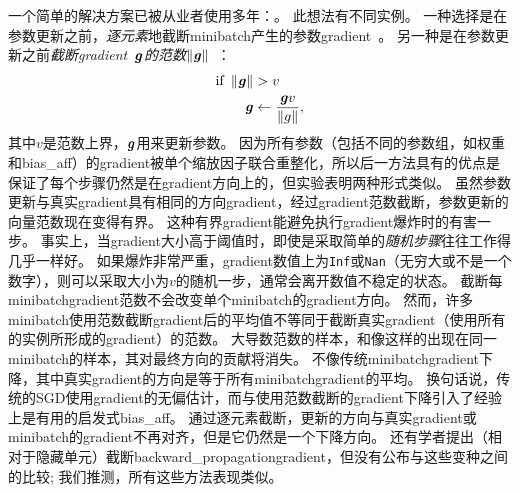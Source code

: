 一个简单的解决方案已被从业者使用多年：。
此想法有不同实例\citep{Mikolov-thesis-2012,Pascanu+al-ICML2013-small}。
一种选择是在参数更新之前，\emph{逐元素}地截断\gls{minibatch}产生的参数\gls{gradient}~\citep{Mikolov-thesis-2012}。
另一种是在参数更新之前\emph{截断\gls{gradient}~$\boldsymbol{\mathit{g}}$的范数$\left\lVert \boldsymbol{\mathit{g}} \right\rVert$}~\citep{Pascanu+al-ICML2013-small}：
\begin{align}
 \text{if}~ \left\lVert\boldsymbol{\mathit{g}}\right\rVert &> v \\
 \boldsymbol{\mathit{g}} &\gets \frac{\boldsymbol{\mathit{g}} v}{\left\lVert g\right\rVert},
\end{align}
其中$v$是范数上界，$\boldsymbol{\mathit{g}}$用来更新参数。
因为所有参数（包括不同的参数组，如权重和\gls{bias_aff}）的\gls{gradient}被单个缩放因子联合重整化，所以后一方法具有的优点是保证了每个步骤仍然是在\gls{gradient}方向上的，但实验表明两种形式类似。
虽然参数更新与真实\gls{gradient}具有相同的方向\gls{gradient}，经过\gls{gradient}范数截断，参数更新的向量范数现在变得有界。
这种有界\gls{gradient}能避免执行\gls{gradient}爆炸时的有害一步。
事实上，当\gls{gradient}大小高于阈值时，即使是采取简单的\emph{随机步骤}往往工作得几乎一样好。
如果爆炸非常严重，\gls{gradient}数值上为{\tt Inf}或{\tt Nan}（无穷大或不是一个数字），则可以采取大小为$v$的随机一步，通常会离开数值不稳定的状态。
截断每\gls{minibatch}\gls{gradient}范数不会改变单个\gls{minibatch}的\gls{gradient}方向。
然而，许多\gls{minibatch}使用范数截断\gls{gradient}后的平均值不等同于截断真实\gls{gradient}（使用所有的实例所形成的\gls{gradient}）的范数。
大导数范数的样本，和像这样的出现在同一\gls{minibatch}的样本，其对最终方向的贡献将消失。
不像传统\gls{minibatch}\gls{gradient}下降，其中真实\gls{gradient}的方向是等于所有\gls{minibatch}\gls{gradient}的平均。
换句话说，传统的\gls{SGD}使用\gls{gradient}的无偏估计，而与使用范数截断的\gls{gradient}下降引入了经验上是有用的启发式\gls{bias_aff}。
通过逐元素截断，更新的方向与真实\gls{gradient}或\gls{minibatch}的\gls{gradient}不再对齐，但是它仍然是一个下降方向。
还有学者提出\citep{Graves-arxiv2013}（相对于隐藏单元）截断\gls{backward_propagation}\gls{gradient}，但没有公布与这些变种之间的比较; 我们推测，所有这些方法表现类似。


